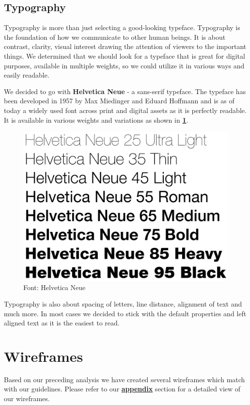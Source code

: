 \subsection{Typography}\label{subsec:typography}
Typography is more than just selecting a good-looking typeface.
Typography is the foundation of how we communicate to other human beings.
It is about contrast, clarity, visual interest drawing the attention of viewers to the important things.
We determined that we should look for a typeface that is great for digital purposes, available in multiple weights, so
we could utilize it in various ways and easily readable.

We decided to go with \textbf{Helvetica Neue} - a sans-serif typeface.
The typeface has been developed in 1957 by Max Miedinger and Eduard Hoffmann and is as of today a widely used font
across print and digital assets as it is perfectly readable.
It is available in various weights and variations as shown in \textbf{\ref{fig:figure4}}.

\begin{figure}[H]
    \centering
    \includegraphics[width=1.0\textwidth]{./images/helvetica-neue}
    \caption{Font: Helvetica Neue}
    \label{fig:figure4}
\end{figure}

Typography is also about spacing of letters, line distance, alignment of text and much more.
In most cases we decided to stick with the default properties and left aligned text as it is the easiest to read.

\section{Wireframes}\label{sec:wireframes}

Based on our preceding analysis we have created several wireframes which match with our guidelines.
Please refer to our \hyperref[ch:wireframes]{\textbf{appendix}} section for a detailed view of our wireframes.
